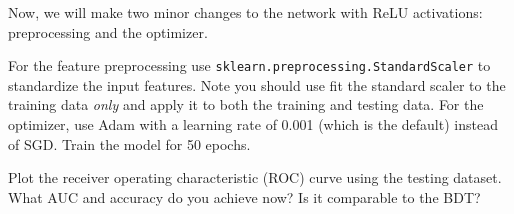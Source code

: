 \begin{problem}[5]
Now, we will make two minor changes to the network with ReLU activations: preprocessing and the optimizer.

For the feature preprocessing use \texttt{sklearn.preprocessing.StandardScaler} to standardize the input features.
Note you should use fit the standard scaler to the training data \emph{only} and apply it to both the training and testing data.
For the optimizer, use Adam with a learning rate of 0.001 (which is the default) instead of SGD. Train the model for 50 epochs.

Plot the receiver operating characteristic (ROC) curve using the testing dataset.
What AUC and accuracy do you achieve now?
Is it comparable to the BDT?
\end{problem}



